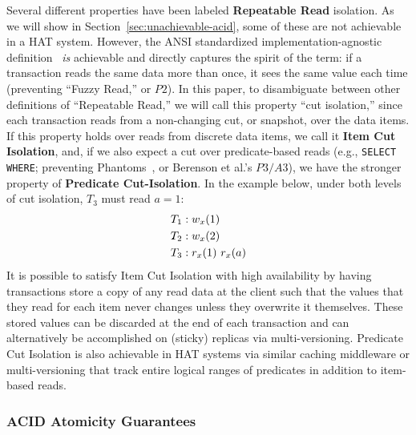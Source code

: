 Several different properties have been labeled \textbf{Repeatable
  Read} isolation. As we will show in
Section~\ref{sec:unachievable-acid}, some of these are not achievable
in a HAT system. However, the ANSI standardized
implementation-agnostic definition~\cite{ansi-sql} \textit{is}
achievable and directly captures the spirit of the term: if a
transaction reads the same data more than once, it sees the same value each
time (preventing ``Fuzzy Read,'' or $P2$). In this paper, to
disambiguate between other definitions of ``Repeatable Read,'' we will
call this property ``cut isolation,'' since each transaction reads
from a non-changing cut, or snapshot, over the data items. If this
property holds over reads from discrete data items, we call it
\textbf{Item Cut Isolation}, and, if we also expect a cut over
predicate-based reads (e.g., \texttt{SELECT WHERE}; preventing
Phantoms~\cite{gray-isolation}, or Berenson et al.'s $P3/A3$), we have
the stronger property of \textbf{Predicate Cut-Isolation}. In the
example below, under both levels of cut isolation, $T_3$ must read
$a=1$:
\begin{align*}
\small
T_1 &: w_x(1)
\\T_2 &: w_x(2)
\\T_3 &: r_x(1)~r_x(a)
\end{align*}
It is possible to satisfy Item Cut Isolation with high availability by
having transactions store a copy of any read data at the client such
that the values that they read for each item never changes unless they
overwrite it themselves. These stored values can be discarded at the
end of each transaction and can alternatively be accomplished on
(sticky) replicas via multi-versioning. Predicate Cut Isolation is
also achievable in HAT systems via similar caching middleware or
multi-versioning that track entire logical ranges of predicates in
addition to item-based reads.

\subsubsection{ACID Atomicity Guarantees}
\label{sec:ta}


